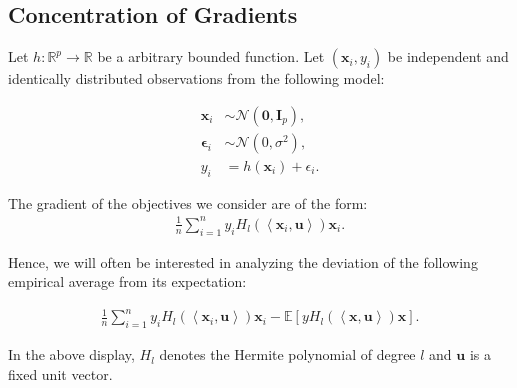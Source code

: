 \documentclass[final,12pt]{colt2018} %
\newcommand{\E}{\mathbb{E}}
\newcommand{\R}{\mathbb{R}}
\newcommand{\gauss}[2]{\mathcal{N}\left( #1,#2 \right)}
\renewcommand\v[1]{{\ensuremath{\boldsymbol{#1}}}}
\newcommand\ip[1]{\left\langle #1 \right\rangle}
\begin{document}
\subsection{Concentration of Gradients}
Let $h: \R^p \rightarrow \R$ be a arbitrary bounded function. Let $(\v x_i, y_i)$ be independent and identically distributed observations from the following model:

\begin{align*}
    \v x_i & \sim \gauss{\v 0}{\v I_p}, \\
    \v \epsilon_i & \sim \gauss{0}{\sigma^2}, \\
    y_i &= h(\v x_i) + \epsilon_i.
\end{align*}

The gradient of the objectives we consider are of the form:
\begin{align*}
    \frac{1}{n} \sum_{i=1}^n y_i H_l(\ip{\v x_i, \v u}) \v x_i.
\end{align*}

Hence, we will often be interested in analyzing the deviation of the following empirical average from its expectation: 

\begin{align*}
    \frac{1}{n} \sum_{i=1}^n y_i H_l(\ip{\v x_i, \v u}) \v x_i - \E[y H_l(\ip{\v x, \v u}) \v x]. 
\end{align*}

In the above display, $H_l$ denotes the Hermite polynomial of degree $l$ and $\v u$ is a fixed unit vector. 
\end{document}
